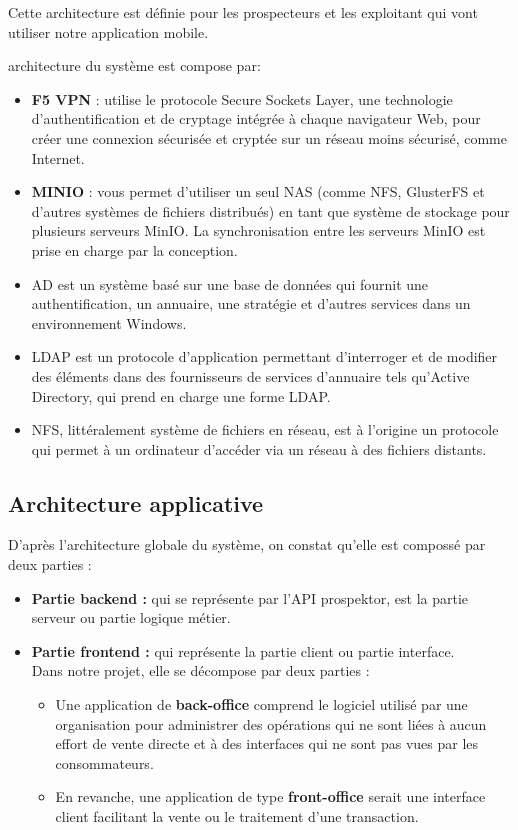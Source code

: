 Cette architecture est d\'efinie pour les prospecteurs et les exploitant qui vont utiliser notre application mobile.

architecture du syst\`eme est compose par:
\begin{itemize}
\item \textbf{F5 VPN} : utilise le protocole Secure Sockets Layer, une technologie d'authentification et de cryptage int\'egr\'ee \`a chaque navigateur Web, pour cr\'eer une connexion s\'ecuris\'ee et crypt\'ee sur un r\'eseau moins s\'ecuris\'e, comme Internet.
\item \textbf{MINIO} : vous permet d'utiliser un seul \gls{NAS} (comme \gls{NFS}, GlusterFS et d'autres syst\`emes de fichiers distribu\'es) en tant que syst\`eme de stockage pour plusieurs serveurs MinIO. La synchronisation entre les serveurs MinIO est prise en charge par la conception.
\item \gls{AD} est un syst\`eme bas\'e sur une base de donn\'ees qui fournit une authentification, un annuaire, une strat\'egie et d'autres services dans un environnement Windows.
\item \gls{LDAP} est un protocole d'application permettant d'interroger et de modifier des \'el\'ements dans des fournisseurs de services d'annuaire tels qu'Active Directory, qui prend en charge une forme LDAP.
\item \gls{NFS}, litt\'eralement système de fichiers en r\'eseau, est \`a l'origine un protocole qui permet \`a un ordinateur d'acc\'eder via un r\'eseau \`a des fichiers distants.
\end{itemize}

\subsection{Architecture applicative} 

D'apr\`es l'architecture globale du syst\`eme, on constat qu'elle est composs\'e par deux parties :

\begin{itemize}
\item \textbf{Partie backend :} qui se repr\'esente par l'API prospektor, est la partie serveur ou partie logique m\'etier.
\item \textbf{Partie frontend :} qui repr\'esente la partie client ou partie interface.\\
Dans notre projet, elle se d\'ecompose par deux parties :
\begin{itemize}
\item Une application de \textbf{back-office} comprend le logiciel utilis\'e par une organisation pour administrer des op\'erations qui ne sont li\'ees \`a aucun effort de vente directe et \`a des interfaces qui ne sont pas vues par les consommateurs.
\item En revanche, une application de type \textbf{front-office} serait une interface client facilitant la vente ou le traitement d'une transaction.
\end{itemize}
\end{itemize}



